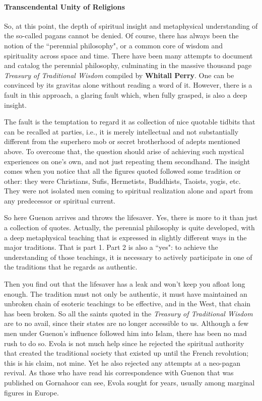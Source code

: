 \paragraph{Transcendental Unity of Religions}
So, at this point, the depth of spiritual insight and metaphysical understanding of the so-called pagans cannot be denied. Of course, there has always been the notion of the ``perennial philosophy", or a common core of wisdom and spirituality across space and time. There have been many attempts to document and catalog the perennial philosophy, culminating in the massive thousand page \emph{Treasury of Traditional Wisdom} compiled by \textbf{Whitall Perry}. One can be convinced by its gravitas alone without reading a word of it. However, there is a fault in this approach, a glaring fault which, when fully grasped, is also a deep insight.

The fault is the temptation to regard it as collection of nice quotable tidbits that can be recalled at parties, i.e., it is merely intellectual and not substantially different from the superhero mob or secret brotherhood of adepts mentioned above. To overcome that, the question should arise of achieving such mystical experiences on one's own, and not just repeating them secondhand. The insight comes when you notice that all the figures quoted followed some tradition or other: they were Christians, Sufis, Hermetists, Buddhists, Taoists, yogis, etc. They were not isolated men coming to spiritual realization alone and apart from any predecessor or spiritual current.

So here Guenon arrives and throws the lifesaver. Yes, there is more to it than just a collection of quotes. Actually, the perennial philosophy is quite developed, with a deep metaphysical teaching that is expressed in slightly different ways in the major traditions. That is part 1. Part 2 is also a ``yes": to achieve the understanding of those teachings, it is necessary to actively participate in one of the traditions that he regards as authentic.

Then you find out that the lifesaver has a leak and won't keep you afloat long enough. The tradition must not only be authentic, it must have maintained an unbroken chain of esoteric teachings to be effective, and in the West, that chain has been broken. So all the saints quoted in the \emph{Treasury of Traditional Wisdom} are to no avail, since their states are no longer accessible to us. Although a few men under Guenon's influence followed him into Islam, there has been no mad rush to do so. Evola is not much help since he rejected the spiritual authority that created the traditional society that existed up until the French revolution; this is his claim, not mine. Yet he also rejected any attempts at a neo-pagan revival. As those who have read his correspondence with Guenon that was published on Gornahoor can see, Evola sought for years, usually among marginal figures in Europe.

